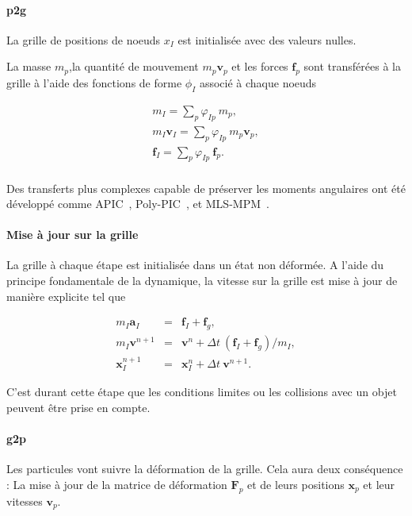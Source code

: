 \paragraph*{p2g}

La grille de positions de noeuds $x_I$ est initialisée avec des valeurs nulles.

La masse $m_p$,la quantité de mouvement $m_p \bm v_p$ et les forces $\bm f_p$ sont transférées à la grille à l'aide des fonctions de forme $\phi_I$ associé à chaque noeuds

\begin{eqnarray*}
    m_I = \sum_p \varphi_{Ip}~ m_p, \\
    m_I \bm v_I  =  \sum_p \varphi_{Ip}~ m_p \bm v_p, \\
    \bm f_I  =  \sum_p \varphi_{Ip}~  \bm f_p. \\
\end{eqnarray*}

Des transferts plus complexes capable de préserver les moments angulaires ont été développé comme APIC~\cite{jiang_affine_2015}, Poly-PIC~\cite{fu_polynomial_2017}, et MLS-MPM~\cite{hu_moving_2018}.

\paragraph*{Mise à jour sur la grille}
La grille à chaque étape est initialisée dans un état non déformée. A l'aide du principe fondamentale de la dynamique, la vitesse sur la grille est mise à jour de manière explicite tel que

\begin{eqnarray*}
    m_I \bm a_I &=& \bm f_I + \bm f_g, \\
    m_I \bm v^{n+1} &=& \bm v^{n} + \Delta t~ (\bm f_I + \bm f_g) / m_I, \\
    \bm x_I^{n+1} &=& \bm x_I^{n} + \Delta t~\bm v^{n+1}.
\end{eqnarray*}

C'est durant cette étape que les conditions limites ou les collisions avec un objet peuvent être prise en compte.

\paragraph{g2p}

Les particules vont suivre la déformation de la grille. Cela aura deux conséquence : La mise à jour de la matrice de déformation $\bm F_p$ et de leurs positions $\bm x_p$ et leur vitesses $\bm v_p$.

